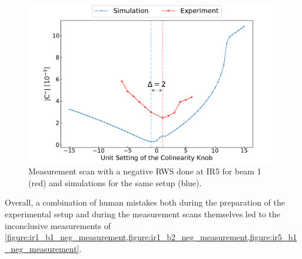\begin{figure}[!htb]
    \centering
    \includegraphics*[width=\textwidth]{Figures/Appendices/rws_measurement_ir5_b2_neg.pdf}
    \caption{Measurement scan with a negative RWS done at IR\num{5} for beam \num{1} (\textcolor{mplr}{red}) and simulations for the same setup (\textcolor{mplblue}{blue}).}
    \label{figure:ir5_b2_neg_measurement}
\end{figure}

Overall, a combination of human mistakes both during the preparation of the experimental setup and during the measurement scans themselves led to the inconclusive measurements of \cref{figure:ir1_b1_neg_measurement,figure:ir1_b2_neg_measurement,figure:ir5_b1_neg_measurement}.

\glsresetall                                     %
